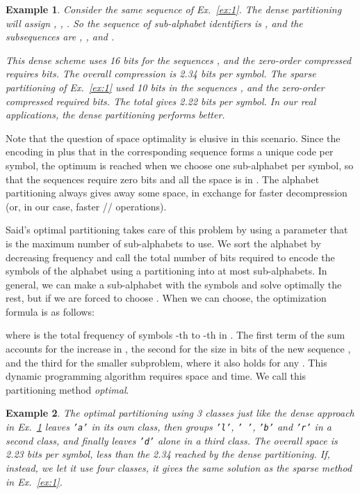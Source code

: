 \documentclass[11pt]{article}
\newtheorem{example}{Example}
\begin{document}
\begin{table}[t]
{\begin{tabular}
\begin{example} \label{ex:dense}
Consider the same sequence  of 
Ex.~\ref{ex:1}. The dense partitioning will assign ,
,
. 
So the sequence of sub-alphabet identifiers is , and the
subsequences are , 
, and .

This dense scheme uses 16 bits for the sequences , and the
zero-order compressed  requires  bits. The overall
compression is 2.34 bits per symbol. The sparse partitioning of 
Ex.~\ref{ex:1} used 10 bits in the sequences , and the zero-order
compressed  required  bits. The total gives
2.22 bits per symbol. In our real applications, the dense partitioning
performs better.
\end{example}

Note that the question of space optimality is elusive in this scenario.
Since the encoding in  plus that in the corresponding sequence 
forms a unique code per symbol, the optimum is reached when we choose one
sub-alphabet per symbol, so that the sequences  require zero bits
and all the space is in . The alphabet partitioning
always gives away some space, in exchange for faster decompression (or, in 
our case, faster // operations).

Said's optimal partitioning \cite{Sai05} takes care of this problem by using
a parameter  that is the maximum number of sub-alphabets to use. 
We sort the alphabet by decreasing frequency and call  the total number
of bits required to encode the symbols  of the alphabet using 
a partitioning into at most  sub-alphabets. In general, we can make a
sub-alphabet with the symbols  and solve optimally the rest, but if
 we are forced to choose . When we can choose, the optimization
formula is as follows: 

where  is the total frequency of symbols -th to -th in . The first 
term of the sum accounts for the increase in , the second for
the size in bits of the new sequence , and the third for the smaller
subproblem, where it also holds  for any . This dynamic 
programming algorithm requires  space and  time.
We call this partitioning method {\em optimal}.

\begin{example}
The optimal partitioning using 3 classes just like the dense approach in
Ex.~\ref{ex:dense} leaves \texttt{'a'} in its own class, then groups
\texttt{'l'}, \texttt{' '}, \texttt{'b'} and \texttt{'r'} in a second class,
and finally leaves \texttt{'d'} alone in a third class. The overall space
 is 2.23 bits per
symbol, less than the 2.34 reached by the dense partitioning. If, instead,
we let it use four classes, it gives the same solution as the sparse method in 
Ex.~\ref{ex:1}.
\end{example}


\end{tabular}}
\end{table}
\end{document}
